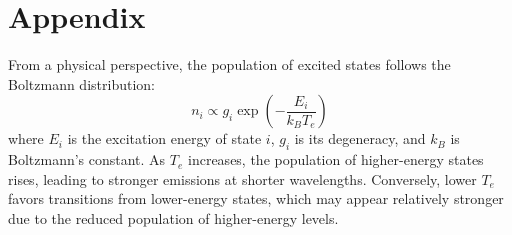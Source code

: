 \documentclass[12pt,a4paper]{article}
\begin{document}
%	
	\section{Appendix}
	From a physical perspective, the population of excited states follows the Boltzmann distribution:
	\[
	n_i \propto g_i \exp\left(-\frac{E_i}{k_B T_e}\right)
	\]
	where $E_i$ is the excitation energy of state $i$, $g_i$ is its degeneracy, and $k_B$ is Boltzmann’s constant. As $T_e$ increases, the population of higher-energy states rises, leading to stronger emissions at shorter wavelengths. Conversely, lower $T_e$ favors transitions from lower-energy states, which may appear relatively stronger due to the reduced population of higher-energy levels.
	
\end{document}

